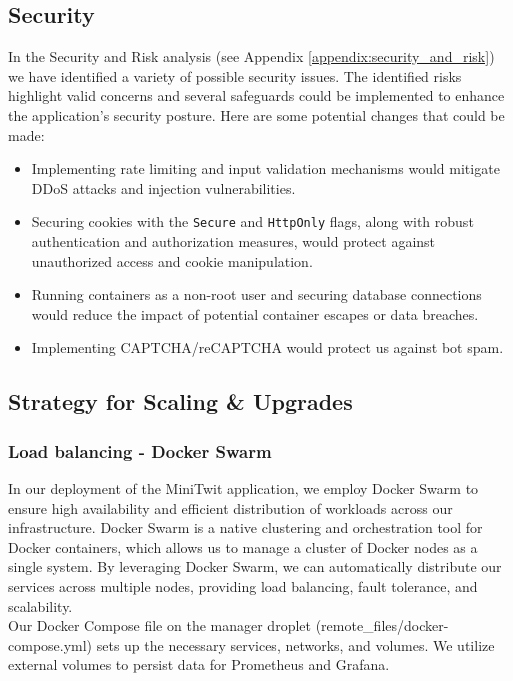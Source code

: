 \subsection{Security}
In the Security and Risk analysis (see Appendix \ref{appendix:security_and_risk}) we have identified a variety of possible security issues. The identified risks highlight valid concerns and several safeguards could be implemented to enhance the application's security posture. Here are some potential changes that could be made:
\begin{itemize}
    \item Implementing rate limiting and input validation mechanisms would mitigate DDoS attacks and injection vulnerabilities.
    \item Securing cookies with the \verb|Secure| and \verb|HttpOnly| flags, along with robust authentication and authorization measures, would protect against unauthorized access and cookie manipulation.
    \item Running containers as a non-root user and securing database connections would reduce the impact of potential container escapes or data breaches.
    \item Implementing CAPTCHA/reCAPTCHA would protect us against bot spam.
\end{itemize} 

\subsection{Strategy for Scaling \& Upgrades}
\subsubsection*{Load balancing - Docker Swarm}
In our deployment of the MiniTwit application, we employ Docker Swarm to ensure high availability and efficient distribution of workloads across our infrastructure. Docker Swarm is a native clustering and orchestration tool for Docker containers, which allows us to manage a cluster of Docker nodes as a single system. By leveraging Docker Swarm, we can automatically distribute our services across multiple nodes, providing load balancing, fault tolerance, and scalability. \\

Our Docker Compose file on the manager droplet (remote\_files/docker-compose.yml) sets up the necessary services, networks, and volumes. We utilize external volumes to persist data for Prometheus and Grafana. \\

